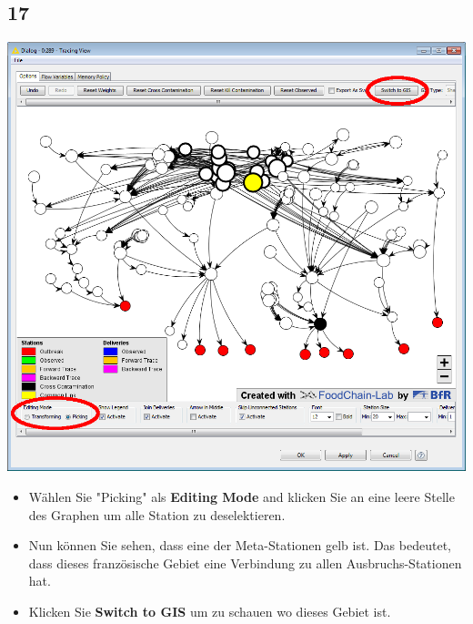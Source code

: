 \documentclass{beamer}
\begin{document}
\subsection{17}
\begin{frame}
	\begin{center}
  		\includegraphics[height=0.5\textheight]{17.png}
	\end{center}
	\begin{itemize}
		\item Wählen Sie "Picking" als \textbf{Editing Mode} and klicken Sie an eine leere Stelle des Graphen um alle Station zu deselektieren.
		\item Nun können Sie sehen, dass eine der Meta-Stationen gelb ist. Das bedeutet, dass dieses französische Gebiet eine Verbindung zu allen Ausbruchs-Stationen hat.
		\item Klicken Sie \textbf{Switch to GIS} um zu schauen wo dieses Gebiet ist.
	\end{itemize}
\end{frame}
\end{document}
